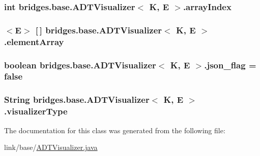 \subsubsection[{array\+Index}]{\setlength{\rightskip}{0pt plus 5cm}int {\bf bridges.\+base.\+A\+D\+T\+Visualizer}$<$ K, E $>$.array\+Index\hspace{0.3cm}{\ttfamily [protected]}}\label{classbridges_1_1base_1_1_a_d_t_visualizer_a6304c4131e3e7eb5953402368b0e9e3c}
\hypertarget{classbridges_1_1base_1_1_a_d_t_visualizer_a320739b4be463d3987b3de2463b0d592}{}
\subsubsection[{element\+Array}]{$<$E$>$ \mbox{[}$\,$\mbox{]} {\bf bridges.\+base.\+A\+D\+T\+Visualizer}$<$ K, E $>$.element\+Array}\label{classbridges_1_1base_1_1_a_d_t_visualizer_a320739b4be463d3987b3de2463b0d592}
\hypertarget{classbridges_1_1base_1_1_a_d_t_visualizer_abf75be63a37f31ada7f92a84bb1bc536}{}
\subsubsection[{json\+\_\+flag}]{\setlength{\rightskip}{0pt plus 5cm}boolean {\bf bridges.\+base.\+A\+D\+T\+Visualizer}$<$ K, E $>$.json\+\_\+flag = false\hspace{0.3cm}{\ttfamily [protected]}}\label{classbridges_1_1base_1_1_a_d_t_visualizer_abf75be63a37f31ada7f92a84bb1bc536}
\hypertarget{classbridges_1_1base_1_1_a_d_t_visualizer_a288aece657b5641f48e839b34f3884b9}{}
\subsubsection[{visualizer\+Type}]{\setlength{\rightskip}{0pt plus 5cm}String {\bf bridges.\+base.\+A\+D\+T\+Visualizer}$<$ K, E $>$.visualizer\+Type}\label{classbridges_1_1base_1_1_a_d_t_visualizer_a288aece657b5641f48e839b34f3884b9}


The documentation for this class was generated from the following file\+:\begin{DoxyCompactItemize}
\item 
link/base/\hyperlink{_a_d_t_visualizer_8java}{A\+D\+T\+Visualizer.\+java}\end{DoxyCompactItemize}
